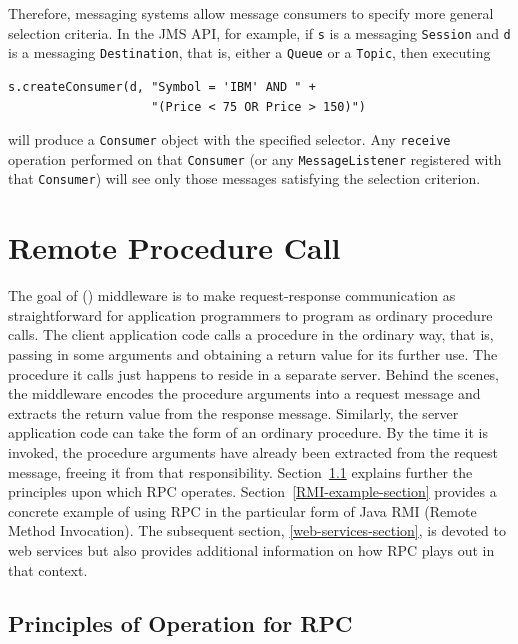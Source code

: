 Therefore, messaging systems allow message consumers to specify more general selection
criteria.  In the JMS API,  for example, if \verb|s| is a messaging
\verb|Session| and \verb|d| is a messaging \verb|Destination|, that
is, either a \verb|Queue| or a \verb|Topic|, then executing
\begin{verbatim}
s.createConsumer(d, "Symbol = 'IBM' AND " +
                    "(Price < 75 OR Price > 150)")
\end{verbatim}
will produce a \verb|Consumer| object with the specified selector.
Any \verb|receive| operation performed on that \verb|Consumer| (or any
\verb|MessageListener| registered with that \verb|Consumer|) will see
only those messages satisfying the selection criterion.

\section{Remote Procedure Call}\label{RPC-section}

The goal of  () middleware is
to make request-response communication as straightforward for
application programmers to program as ordinary procedure calls.  The
client application code calls a procedure in the ordinary way, that is, passing
in some arguments and obtaining a return value for its further use.
The procedure it calls just happens to reside in a separate server.
Behind the scenes, the middleware encodes the procedure arguments into
a request message and extracts the return value from the response
message.  Similarly, the server application code can take the form of
an ordinary procedure.  By the time it is invoked, the procedure
arguments have already been extracted from the request message,
freeing it from that responsibility.
Section~\ref{RPC-generalities-section} explains further the
principles upon which RPC operates.  Section~\ref{RMI-example-section}
provides a concrete example of using RPC in the particular form of
Java RMI (Remote Method Invocation).  The subsequent section,
\ref{web-services-section}, is devoted to web services but also
provides additional information on how RPC plays out in that context.

\subsection{Principles of Operation for RPC}\label{RPC-generalities-section}

